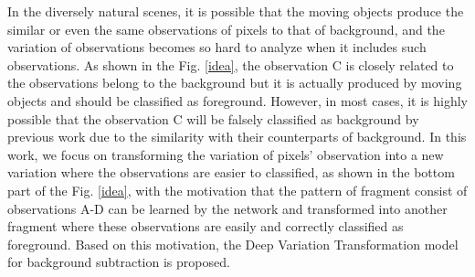 \documentclass[journal]{IEEEtran}
\newcommand{\reffig}[1]{Fig. \ref{#1}}
\begin{document}
In the diversely natural scenes,
it is possible that the moving objects produce the similar or even the same observations of pixels to that of background,
and the variation of observations becomes so hard to analyze when it includes such observations.
As shown in the \reffig{idea},
the observation C is closely related to the observations belong to the background but it is actually produced by moving objects and should be classified as foreground.
However, in most cases, it is highly possible that the observation C will be falsely classified as background by previous work due to the similarity with their counterparts of background.
In this work, we focus on transforming the variation of pixels' observation into a new variation where the observations are easier to classified,
as shown in the bottom part of the \reffig{idea},
with the motivation that the pattern of fragment consist of observations A-D can be learned by the network and transformed into another fragment where these observations are easily and correctly classified as foreground.
Based on this motivation, the Deep Variation Transformation model for background subtraction is proposed.
% 
\end{document}
